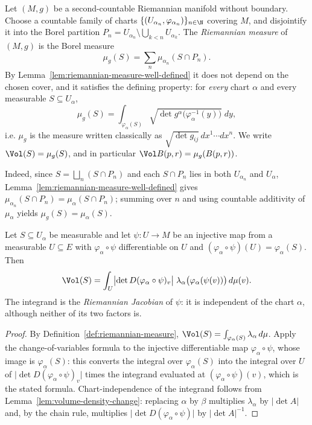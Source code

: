 \begin{definition}
\label{def:riemannian-measure}
\leanok
Let $(M,g)$ be a second-countable Riemannian manifold without boundary. Choose a countable
family of charts $\{(U_{\alpha_n},\varphi_{\alpha_n})\}_{n\in\N}$ covering $M$, and
disjointify it into the Borel partition
$P_n=U_{\alpha_n}\setminus\bigcup_{k<n}U_{\alpha_k}$. The \emph{Riemannian measure} of
$(M,g)$ is the Borel measure
$$\mu_g(S)=\sum_{n}\mu_{\alpha_n}(S\cap P_n).$$
By Lemma~\ref{lem:riemannian-measure-well-defined} it does not depend on the chosen cover, and
it satisfies the defining property: for \emph{every} chart $\alpha$ and every measurable
$S\subseteq U_\alpha$,
$$\mu_g(S)=\int_{\varphi_\alpha(S)}\sqrt{\det g^\alpha\bigl(\varphi_\alpha^{-1}(y)\bigr)}\;dy,$$
i.e. $\mu_g$ is the measure written classically as $\sqrt{\det g_{ij}}\,dx^1\cdots dx^n$. We
write $\Vol(S)=\mu_g(S)$, and in particular $\Vol B(p,r)=\mu_g(B(p,r))$.

Indeed, since $S=\bigsqcup_n (S\cap P_n)$ and each $S\cap P_n$ lies in both $U_{\alpha_n}$ and
$U_\alpha$, Lemma~\ref{lem:riemannian-measure-well-defined} gives
$\mu_{\alpha_n}(S\cap P_n)=\mu_\alpha(S\cap P_n)$; summing over $n$ and using countable
additivity of $\mu_\alpha$ yields $\mu_g(S)=\mu_\alpha(S)$.
\end{definition}

\begin{lemma}
\label{lem:riemannian-measure-jacobian}
\leanok
Let $S\subseteq U_\alpha$ be measurable and let $\psi\colon U\to M$ be an injective map from a
measurable $U\subseteq E$ with $\varphi_\alpha\circ\psi$ differentiable on $U$ and
$(\varphi_\alpha\circ\psi)(U)=\varphi_\alpha(S)$. Then
$$\Vol(S)=\int_U \bigl\lvert\det D(\varphi_\alpha\circ\psi)_v\bigr\rvert\;
\lambda_\alpha\bigl(\varphi_\alpha(\psi(v))\bigr)\,d\mu(v).$$
The integrand is the \emph{Riemannian Jacobian} of $\psi$: it is independent of the chart
$\alpha$, although neither of its two factors is.
\end{lemma}

\begin{proof}
\leanok
By Definition~\ref{def:riemannian-measure},
$\Vol(S)=\int_{\varphi_\alpha(S)}\lambda_\alpha\,d\mu$. Apply the change-of-variables formula
to the injective differentiable map $\varphi_\alpha\circ\psi$, whose image is
$\varphi_\alpha(S)$: this converts the integral over $\varphi_\alpha(S)$ into the integral
over $U$ of $\lvert\det D(\varphi_\alpha\circ\psi)_v\rvert$ times the integrand evaluated at
$(\varphi_\alpha\circ\psi)(v)$, which is the stated formula. Chart-independence of the
integrand follows from Lemma~\ref{lem:volume-density-change}: replacing $\alpha$ by $\beta$
multiplies $\lambda_\alpha$ by $\lvert\det A\rvert$ and, by the chain rule, multiplies
$\lvert\det D(\varphi_\alpha\circ\psi)\rvert$ by $\lvert\det A\rvert^{-1}$.
\end{proof}

